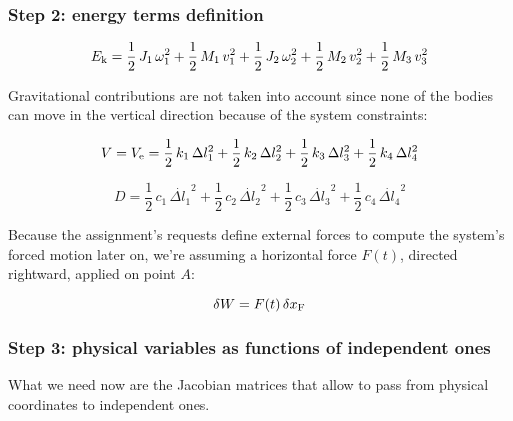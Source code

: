 \documentclass[a4paper,12pt,oneside]{article}
\begin{document}
\subsubsection*{Step 2: energy terms definition}
\label{ssubs:energy_terms}

\[
	E_\textup{k} = \frac{1}{2} \, J_1 \, \omega_1^2 + \frac{1}{2} \, M_1 \, v_1^2 +
		\frac{1}{2} \, J_2 \, \omega_2^2 + \frac{1}{2} \, M_2 \, v_2^2 +
		\frac{1}{2} \, M_3 \, v_3^2
\]

Gravitational contributions are not taken into account since none of the bodies can move in the vertical direction because of the system constraints:

\[
	V = V_\textup{e} = \frac{1}{2} \, k_1 \, \Delta l_1^2 +
		\frac{1}{2} \, k_2 \, \Delta l_2^2 +
		\frac{1}{2} \, k_3 \, \Delta l_3^2 +
		\frac{1}{2} \, k_4 \, \Delta l_4^2
\]

\[
	D = \frac{1}{2} \, c_1 \, \dot{\Delta l_1}^2 +
		\frac{1}{2} \, c_2 \, \dot{\Delta l_2}^2 +
		\frac{1}{2} \, c_3 \, \dot{\Delta l_3}^2 +
		\frac{1}{2} \, c_4 \, \dot{\Delta l_4}^2
\]

Because the assignment's requests define external forces to compute the system's forced motion later on, we're assuming a horizontal force $ F(t) $, directed rightward, applied on point $ A $:

\[ \delta W = F(t) \, \delta x_\textup{F} \]

\subsubsection*{Step 3: physical variables as functions of independent ones}
\label{ssubs:jacobians}

What we need now are the Jacobian matrices that allow to pass from physical coordinates to independent ones.
\end{document}
